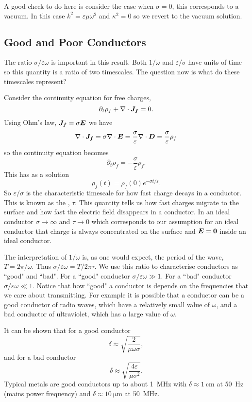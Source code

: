     A good check to do here is consider the case when \(\sigma = 0\), this corresponds to a vacuum.
    In this case \(k^2 = \varepsilon\mu\omega^2\) and \(\kappa^2 = 0\) so we revert to the vacuum solution.
    
    \subsection{Good and Poor Conductors}
    The ratio \(\sigma/\varepsilon\omega\) is important in this result.
    Both \(1/\omega\) and \(\varepsilon/\sigma\) have units of time so this quantity is a ratio of two timescales.
    The question now is what do these timescales represent?
    
    Consider the continuity equation for free charges,
    \[\partial_t\rho_f + \nabla\cdot\bm{J_f} = 0.\]
    Using Ohm's law, \(\bm{J_f} = \sigma\bm{E}\) we have 
    \[\nabla\cdot\bm{J_f} = \sigma\nabla\cdot\bm{E} = \frac{\sigma}{\varepsilon}\nabla\cdot\bm{D} = \frac{\sigma}{\varepsilon}\rho_f\]
    so the continuity equation becomes
    \[\partial_t\rho_f = -\frac{\sigma}{\varepsilon}\rho_f.\]
    This has as a solution
    \[\rho_f(t) = \rho_f(0)e^{-\sigma t/\varepsilon}.\]
    So \(\varepsilon/\sigma\) is the characteristic timescale for how fast charge decays in a conductor.
    This is known as the , \(\tau\).
    This quantity tells us how fast charges migrate to the surface and how fast the electric field disappears in a conductor.
    In an ideal conductor \(\sigma \to \infty\) and \(\tau \to 0\) which corresponds to our assumption for an ideal conductor that charge is always concentrated on the surface and \(\bm{E} = \bm{0}\) inside an ideal conductor.
    
    The interpretation of \(1/\omega\) is, as one would expect, the period of the wave, \(T = 2\pi/\omega\).
    Thus \(\sigma/\varepsilon\omega = T/2\pi\tau\).
    We use this ratio to characterise conductors as ``good" and ``bad".
    For a ``good" conductor \(\sigma/\varepsilon\omega \gg 1\).
    For a ``bad" conductor \(\sigma/\varepsilon\omega \ll 1\).
    Notice that how ``good" a conductor is depends on the frequencies that we care about transmitting.
    For example it is possible that a conductor can be a good conductor of radio waves, which have a relatively small value of \(\omega\), and a bad conductor of ultraviolet, which has a large value of \(\omega\).
   
    
    It can be shown that for a good conductor
    \[\delta \approx \sqrt{\frac{2}{\mu\omega\sigma}},\]
    and for a bad conductor
    \[\delta \approx \sqrt{\frac{4\varepsilon}{\mu\sigma^2}}.\]
    Typical metals are good conductors up to about \SI{1}{\mega\hertz} with \(\delta \approx \SI{1}{\centi\meter}\) at \SI{50}{\hertz} (mains power frequency) and \(\delta \approx \SI{10}{\micro\meter}\) at \SI{50}{\mega\hertz}.
    
